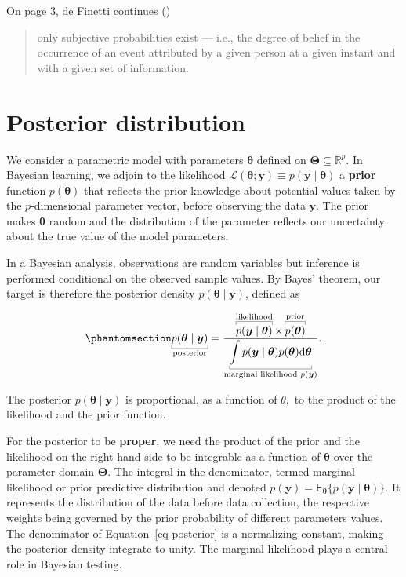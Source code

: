 \documentclass[
  11pt,
  letterpaper,
]{scrbook}
\theoremstyle{definition}
\theoremstyle{plain}
\theoremstyle{plain}
\theoremstyle{definition}
\theoremstyle{definition}
\theoremstyle{remark}
\begin{document}
On page 3, de Finetti continues ()

\begin{quote}
only subjective probabilities exist --- i.e., the degree of belief in
the occurrence of an event attributed by a given person at a given
instant and with a given set of information.
\end{quote}

\section{Posterior distribution}\label{posterior-distribution}

We consider a parametric model with parameters \(\boldsymbol{\theta}\)
defined on \(\boldsymbol{\Theta} \subseteq \mathbb{R}^p\). In Bayesian
learning, we adjoin to the likelihood
\(\mathcal{L}(\boldsymbol{\theta}; \boldsymbol{y}) \equiv p(\boldsymbol{y} \mid \boldsymbol{\theta})\)
a \textbf{prior} function \(p(\boldsymbol{\theta})\) that reflects the
prior knowledge about potential values taken by the \(p\)-dimensional
parameter vector, before observing the data \(\boldsymbol{y}\). The
prior makes \(\boldsymbol{\theta}\) random and the distribution of the
parameter reflects our uncertainty about the true value of the model
parameters.

In a Bayesian analysis, observations are random variables but inference
is performed conditional on the observed sample values. By Bayes'
theorem, our target is therefore the posterior density
\(p(\boldsymbol{\theta} \mid \boldsymbol{y})\), defined as

\begin{equation}\phantomsection\label{eq-posterior}{
\underbracket[0.25pt]{p(\boldsymbol{\theta} \mid \boldsymbol{y})}_{\text{posterior}} = \frac{\overbracket[0.25pt]{p(\boldsymbol{y} \mid \boldsymbol{\theta})}^{\text{likelihood}} \times  \overbracket[0.25pt]{p(\boldsymbol{\theta})}^{\text{prior}}}{\underbracket[0.25pt]{\int p(\boldsymbol{y} \mid \boldsymbol{\theta}) p(\boldsymbol{\theta}) \mathrm{d} \boldsymbol{\theta}}_{\text{marginal likelihood }p(\boldsymbol{y})}}.
}\end{equation}

The posterior \(p(\boldsymbol{\theta} \mid \boldsymbol{y})\) is
proportional, as a function of \(\theta,\) to the product of the
likelihood and the prior function.

For the posterior to be \textbf{proper}, we need the product of the
prior and the likelihood on the right hand side to be integrable as a
function of \(\boldsymbol{\theta}\) over the parameter domain
\(\boldsymbol{\Theta}\). The integral in the denominator, termed
marginal likelihood or prior predictive distribution and denoted
\(p(\boldsymbol{y}) = \mathsf{E}_{\boldsymbol{\theta}}\{p(\boldsymbol{y} \mid \boldsymbol{\theta})\}\).
It represents the distribution of the data before data collection, the
respective weights being governed by the prior probability of different
parameters values. The denominator of Equation~\ref{eq-posterior} is a
normalizing constant, making the posterior density integrate to unity.
The marginal likelihood plays a central role in Bayesian testing.
\end{document}
